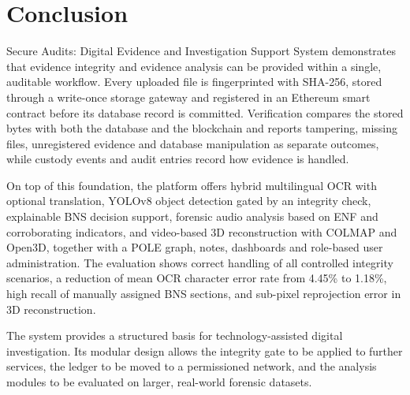 \documentclass[12pt,a4paper,oneside]{report}
\begin{document}
\chapter{Conclusion}
Secure Audits: Digital Evidence and Investigation Support System demonstrates that evidence integrity and evidence analysis can be provided within a single, auditable workflow. Every uploaded file is fingerprinted with SHA-256, stored through a write-once storage gateway and registered in an Ethereum smart contract before its database record is committed. Verification compares the stored bytes with both the database and the blockchain and reports tampering, missing files, unregistered evidence and database manipulation as separate outcomes, while custody events and audit entries record how evidence is handled.

On top of this foundation, the platform offers hybrid multilingual OCR with optional translation, YOLOv8 object detection gated by an integrity check, explainable BNS decision support, forensic audio analysis based on ENF and corroborating indicators, and video-based 3D reconstruction with COLMAP and Open3D, together with a POLE graph, notes, dashboards and role-based user administration. The evaluation shows correct handling of all controlled integrity scenarios, a reduction of mean OCR character error rate from 4.45\% to 1.18\%, high recall of manually assigned BNS sections, and sub-pixel reprojection error in 3D reconstruction.

The system provides a structured basis for technology-assisted digital investigation. Its modular design allows the integrity gate to be applied to further services, the ledger to be moved to a permissioned network, and the analysis modules to be evaluated on larger, real-world forensic datasets.
\end{document}

